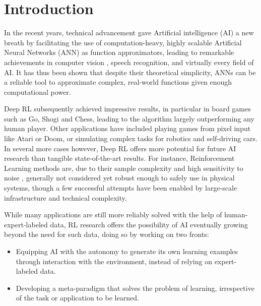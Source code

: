 \section{Introduction}
\label{sec:intro}
In the recent years, technical advancement gave Artificial intelligence (AI) a new breath by facilitating the use of computation-heavy, highly scalable Artificial Neural Networks (ANN) as function approximators, leading to remarkable achievements in computer vision \cite{krizhevsky2012imagenet}, speech recognition\cite{dahl2011context}, and virtually every field of AI. It has thus been shown that despite their theoretical simplicity, ANNs can be a reliable tool to approximate complex, real-world functions given enough computational power. %



Deep RL subsequently achieved impressive results, in particular in board games such as Go, Shogi and Chess\cite{silver2018general}, leading to the algorithm largely outperforming any human player. Other applications have included playing games from pixel input like Atari\cite{mnih2015human} or Doom\cite{kempka2016vizdoom}, or simulating complex tasks for robotics\cite{levine2016end} and self-driving cars\cite{pan2017virtual}. In several more cases however, Deep RL offers more potential for future AI research than tangible state-of-the-art results. For instance, Reinforcement Learning methods are, due to their sample complexity and high sensitivity to noise\cite{henderson2018deep} \cite{engstrom2020implementation} \cite{dossa2021empirical}, generally not considered yet robust enough to safely use in physical systems, though a few successful attempts have been enabled by large-scale infrastructure and technical complexity. \cite{andrychowicz2020learning}

While many applications are still more reliably solved with the help of human-expert-labeled data,  RL research offers the possibility of AI eventually growing beyond the need for such data, doing so by working on two fronts:
\begin{itemize}
\item Equipping AI with the autonomy to generate its own learning examples through interaction with the environment, instead of relying on expert-labeled data.
\item Developing a meta-paradigm that solves the problem of learning, irrespective of the task or application to be learned.
\end{itemize}

